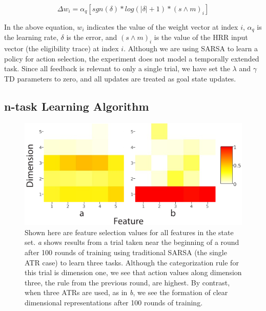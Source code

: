 \documentclass[10pt,letterpaper]{article}
\begin{document}
\begin{equation}
\Delta w_i = \alpha_q [sgn(\delta) * log(| \delta | + 1) * (s \wedge m)_i]
\label{eq:weight_update_transform}
\end{equation}

In the above equation, $ w_i $ indicates the value of the weight vector at index $ i $, $ \alpha_q $ is the learning rate, $ \delta $ is the error, and $ (s \wedge m)_i $ is the value of the HRR input vector (the eligibility trace) at index $ i $. Although we are using SARSA to learn a policy for action selection, the experiment does not model a temporally extended task. Since all feedback is relevant to only a single trial, we have set the $\lambda$ and $\gamma$ TD parameters to zero, and all updates are treated as goal state updates.

\subsection{n-task Learning Algorithm}
\label{sec:n-task}

\begin{figure}[t!]
    \centering
    \includegraphics[scale=.65]{images/actionvals_hm.pdf}
    \caption[]{Shown here are feature selection values for all features in the state set. \textit{a} shows results from a trial taken near the beginning of a round after 100 rounds of training using traditional SARSA (the single ATR case) to learn three tasks. Although the categorization rule for this trial is dimension one, we see that action values along dimension three, the rule from the previous round, are highest. By contrast, when three ATRs are used, as in \textit{b}, we see the formation of clear dimensional representations after 100 rounds of training.}
    \label{fig:actionvals_hm}
\end{figure}
\end{document}

